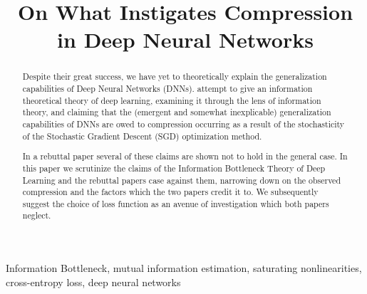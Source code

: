 \documentclass{article}
\title{On What Instigates Compression in Deep Neural Networks}
\begin{document}

\maketitle

\begin{abstract}
	Despite their great success, we have yet to theoretically explain the
	generalization capabilities of Deep Neural Networks (DNNs).
	\cite{shwartzziv2017} attempt to give an information theoretical theory of
	deep learning, examining it through the lens of information theory, and
	claiming that the (emergent and somewhat inexplicable) generalization
	capabilities of DNNs are owed to compression occurring as a result of the
	stochasticity of the Stochastic Gradient Descent (SGD) optimization method.

	In a rebuttal paper \cite{saxe2018} several of these claims are shown not
	to hold in the general case. In this paper we scrutinize the claims of the
	Information Bottleneck Theory of Deep Learning and the rebuttal papers case
	against them, narrowing down on the observed compression and the factors
	which the two papers credit it to. We subsequently suggest the choice of
	loss function as an avenue of investigation which both papers neglect.
\end{abstract}

\begin{keywords}
	Information Bottleneck, mutual information estimation, saturating
	nonlinearities, cross-entropy loss, deep neural networks
\end{keywords}








\end{document}

